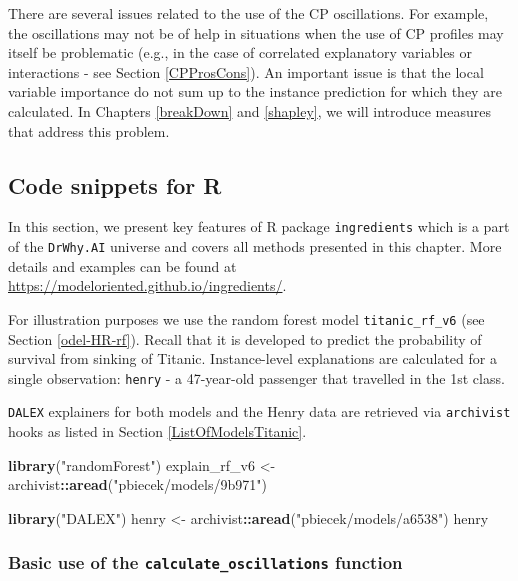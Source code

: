 \documentclass[12pt,]{krantz}
\newenvironment{Shaded}{\begin{snugshade}}{\end{snugshade}}
\newcommand{\KeywordTok}[1]{\textcolor[rgb]{0.13,0.29,0.53}{\textbf{#1}}}
\newcommand{\NormalTok}[1]{#1}
\newcommand{\OperatorTok}[1]{\textcolor[rgb]{0.81,0.36,0.00}{\textbf{#1}}}
\newcommand{\StringTok}[1]{\textcolor[rgb]{0.31,0.60,0.02}{#1}}
\begin{document}
There are several issues related to the use of the CP oscillations. For example, the oscillations may not be of help in situations when the use of CP profiles may itself be problematic (e.g., in the case of correlated explanatory variables or interactions - see Section \ref{CPProsCons}). An important issue is that the local variable importance do not sum up to the instance prediction for which they are calculated. In Chapters \ref{breakDown} and \ref{shapley}, we will introduce measures that address this problem.

\hypertarget{CPOscR}{%
\subsection{Code snippets for R}\label{CPOscR}}

In this section, we present key features of R package \texttt{ingredients} which is a part of the \texttt{DrWhy.AI} universe and covers all methods presented in this chapter. More details and examples can be found at \url{https://modeloriented.github.io/ingredients/}.

For illustration purposes we use the random forest model \texttt{titanic\_rf\_v6} (see Section \ref{odel-HR-rf}). Recall that it is developed to predict the probability of survival from sinking of Titanic. Instance-level explanations are calculated for a single observation: \texttt{henry} - a 47-year-old passenger that travelled in the 1st class.

\texttt{DALEX} explainers for both models and the Henry data are retrieved via \texttt{archivist} hooks as listed in Section \ref{ListOfModelsTitanic}.

\begin{Shaded}
\begin{Highlighting}[]
\KeywordTok{library}\NormalTok{(}\StringTok{"randomForest"}\NormalTok{)}
\NormalTok{explain_rf_v6 <-}\StringTok{ }\NormalTok{archivist}\OperatorTok{::}\KeywordTok{aread}\NormalTok{(}\StringTok{"pbiecek/models/9b971"}\NormalTok{)}

\KeywordTok{library}\NormalTok{(}\StringTok{"DALEX"}\NormalTok{)}
\NormalTok{henry <-}\StringTok{ }\NormalTok{archivist}\OperatorTok{::}\KeywordTok{aread}\NormalTok{(}\StringTok{"pbiecek/models/a6538"}\NormalTok{)}
\NormalTok{henry}
\end{Highlighting}
\end{Shaded}

\hypertarget{basic-use-of-the-calculate_oscillations-function}{%
\subsubsection{\texorpdfstring{Basic use of the \texttt{calculate\_oscillations} function}{Basic use of the calculate\_oscillations function}}\label{basic-use-of-the-calculate_oscillations-function}}
\end{document}
